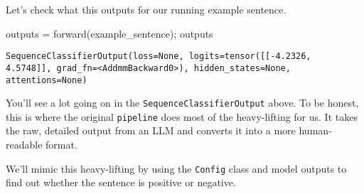 \documentclass[
  letterpaper,
  DIV=11,
  numbers=noendperiod]{scrartcl}
\newenvironment{Shaded}{\begin{snugshade}}{\end{snugshade}}
\newcommand{\NormalTok}[1]{\textcolor[rgb]{0.00,0.23,0.31}{#1}}
\newcommand{\OperatorTok}[1]{\textcolor[rgb]{0.37,0.37,0.37}{#1}}
\begin{document}
Let's check what this outputs for our running example sentence.

\begin{Shaded}
\begin{Highlighting}[]
\NormalTok{outputs }\OperatorTok{=}\NormalTok{ forward(example\_sentence)}\OperatorTok{;}\NormalTok{ outputs}
\end{Highlighting}
\end{Shaded}

\begin{verbatim}
SequenceClassifierOutput(loss=None, logits=tensor([[-4.2326,  4.5748]], grad_fn=<AddmmBackward0>), hidden_states=None, attentions=None)
\end{verbatim}

You'll see a lot going on in the \texttt{SequenceClassifierOutput}
above. To be honest, this is where the original \texttt{pipeline} does
most of the heavy-lifting for us. It takes the raw, detailed output from
an LLM and converts it into a more human-readable format.

We'll mimic this heavy-lifting by using the \texttt{Config} class and
model outputs to find out whether the sentence is positive or negative.
\end{document}
